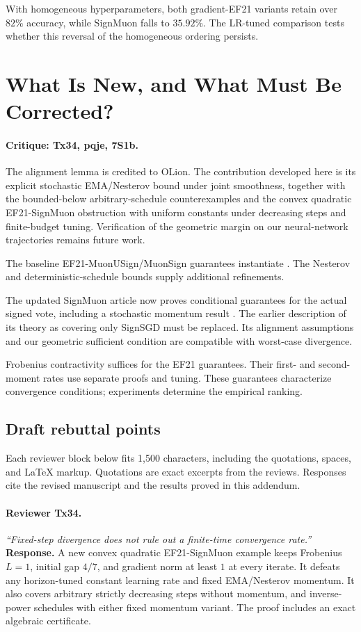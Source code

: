 With homogeneous hyperparameters, both gradient-EF21 variants retain over
$82\%$ accuracy, while SignMuon falls to $35.92\%$. The LR-tuned comparison
tests whether this reversal of the homogeneous ordering persists.

\section{What Is New, and What Must Be Corrected?}
\label{add:novelty}
\paragraph{Critique: Tx34, pqje, 7S1b.}
The alignment lemma is credited to OLion. The contribution developed here
is its explicit stochastic EMA/Nesterov bound under joint smoothness,
together with the bounded-below arbitrary-schedule counterexamples and
the convex quadratic EF21-SignMuon obstruction with uniform constants
under decreasing steps and finite-budget tuning. Verification of the
geometric margin on our neural-network trajectories remains future work.

The baseline EF21-MuonUSign/MuonSign guarantees instantiate
\citet{gruntkowska2025error}. The Nesterov and deterministic-schedule
bounds supply additional refinements.

The updated SignMuon article now proves conditional guarantees for the
actual signed vote, including a stochastic momentum result
\citep{mishra2026signmuonv2}. The earlier description of its theory as
covering only SignSGD must be replaced. Its alignment assumptions and our
geometric sufficient condition are compatible with worst-case divergence.

Frobenius contractivity suffices for the EF21 guarantees. Their first- and
second-moment rates use separate proofs and tuning. These guarantees
characterize convergence conditions; experiments determine the empirical
ranking.

\subsection{Draft rebuttal points}
\label{add:rebuttals}
Each reviewer block below fits 1,500 characters, including the quotations,
spaces, and LaTeX markup. Quotations are exact excerpts from the reviews.
Responses cite the revised manuscript and the results proved in this addendum.

\paragraph{Reviewer Tx34.}
\noindent\emph{``Fixed-step divergence does not rule out a finite-time convergence rate.''}
\textbf{Response.} A new convex quadratic EF21-SignMuon example keeps Frobenius $L=1$, initial gap $4/7$, and gradient norm at least $1$ at every iterate. It defeats any horizon-tuned constant learning rate and fixed EMA/Nesterov momentum. It also covers arbitrary strictly decreasing steps without momentum, and inverse-power schedules with either fixed momentum variant. The proof includes an exact algebraic certificate.

